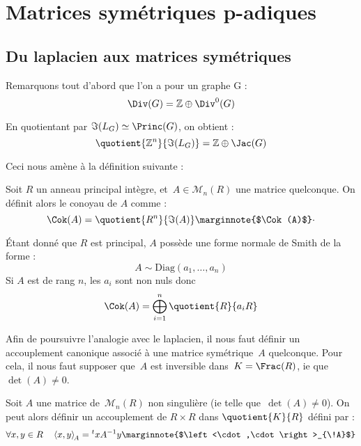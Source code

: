 \section{Matrices symétriques p-adiques}
\subsection{Du laplacien aux matrices symétriques}

Remarquons tout d'abord que l'on a pour un graphe G :
\[ \Div(G) = \mathbb{Z} \oplus \Div^0(G) \]

En quotientant par $\Im(L_G) \simeq \Princ(G)$, on obtient : 
\[ \quotient{\mathbb{Z}^n}{\Im(L_G)} = \mathbb{Z} \oplus \Jac(G) \]

Ceci nous amène à la définition suivante : 
\begin{defi}
Soit $R$ un anneau principal intègre, et~$A\in\mathcal{M}_n(R)$ une matrice quelconque.
On définit alors le conoyau de $A$ comme : 
\[\Cok(A) = \quotient{R^n}{\Im(A)} \text{\marginnote{$\Cok(A)$}}\cdot\]
\end{defi}

\begin{rem}
\'Etant donné que $R$ est principal, $A$ possède une forme normale de Smith de la forme :
\[ A \sim \text{Diag}(a_1,\dots,a_n) \]
Si $A$ est de rang $n$, les $a_i$ sont non nuls donc 
\[\Cok(A) = \bigoplus_{i=1}^n{\quotient{R}{a_iR}}\]
\end{rem}

Afin de poursuivre l'analogie avec le laplacien, il nous faut définir un accouplement canonique associé à une matrice symétrique~$A$ quelconque. Pour cela, il nous faut supposer que~$A$ est inversible dans~$K = \Frac(R)$, ie que~$\det(A)\neq0$.
\begin{defi}
Soit $A$ une matrice de~$\mathcal{M}_n(R)$ non singulière (ie telle que~$\det(A)\neq 0$).
On peut alors définir un accouplement de $R\times R$ dans $\quotient{K}{R}$ défini par :
\[ \forall x,y\in R\quad \left<x,y\right>_{\!A} = {}^txA^{-1}y \text{\marginnote{$\left<\cdot,\cdot\right>_{\!A}$}}\]
\end{defi}

